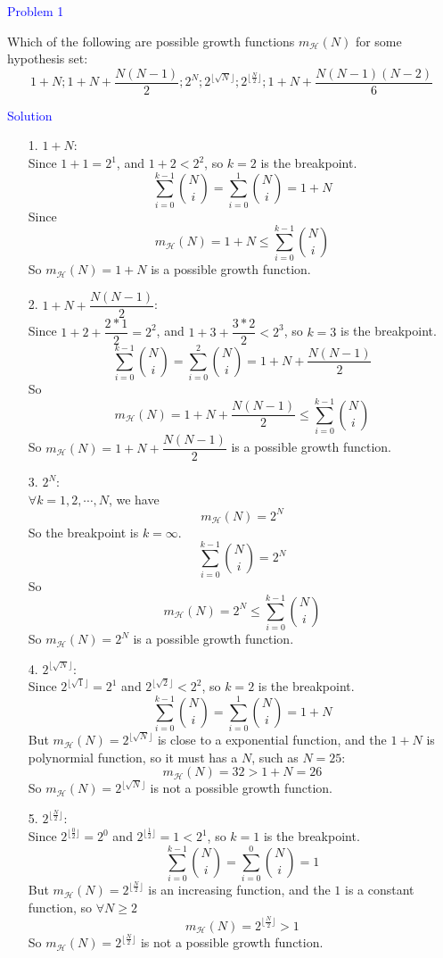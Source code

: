 \textcolor{blue}{Problem 1}

Which of the following are possible growth functions $m_{\mathcal{H}}(N)$ for some hypothesis set:
$$
1+N ; 1+N+\dfrac{N(N-1)}{2} ; 2^N ; 2^{\lfloor\sqrt{N}\rfloor} ; 2^{\lfloor \frac{N}{2} \rfloor} ; 1+N+\dfrac{N(N-1)(N-2)}{6}
$$

\textcolor{blue}{Solution}\\
\begin{itemize}
    \item[1. ] $1+N$:\\
    Since $1+1=2^1$, and $1+2<2^2$, so $k=2$ is the breakpoint.
    $$\sum_{i=0}^{k-1} \binom{N}{i} = \sum_{i=0}^{1} \binom{N}{i} = 1+N$$
    Since $$m_{\mathcal{H}}(N)=1+N\leq \sum_{i=0}^{k-1} \binom{N}{i}$$
    So $m_{\mathcal{H}}(N)=1+N$ is a possible growth function.
    
    \item[2. ]  $1+N+\dfrac{N(N-1)}{2}$:\\
    Since $1+2+\dfrac{2*1}{2}=2^2$, and $1+3+\dfrac{3*2}{2}<2^3$, so $k=3$ is the breakpoint.
    $$\sum_{i=0}^{k-1} \binom{N}{i} = \sum_{i=0}^{2} \binom{N}{i} = 1+N+\dfrac{N(N-1)}{2}$$
    So $$m_{\mathcal{H}}(N)=1+N+\dfrac{N(N-1)}{2}\leq \sum_{i=0}^{k-1} \binom{N}{i}$$
    So $m_{\mathcal{H}}(N)=1+N+\dfrac{N(N-1)}{2}$ is a possible growth function.
    
    \item[3. ] $2^N$:\\
    $\forall k=1,2,\cdots,N$, we have
    $$m_{\mathcal{H}}(N)=2^N$$
    So the breakpoint is $k=\infty$.
    $$\sum_{i=0}^{k-1} \binom{N}{i} = 2^N$$
    So $$m_{\mathcal{H}}(N)=2^N\leq \sum_{i=0}^{k-1} \binom{N}{i}$$
    So $m_{\mathcal{H}}(N)=2^N$ is a possible growth function.
    
    \item[4.] $2^{\lfloor\sqrt{N}\rfloor}$:\\
    Since $2^{\lfloor\sqrt{1}\rfloor}=2^1$ and $2^{\lfloor\sqrt{2}\rfloor}<2^2$, so $k=2$ is the breakpoint.
    $$\sum_{i=0}^{k-1} \binom{N}{i} = \sum_{i=0}^{1} \binom{N}{i} = 1+N$$
    But $m_{\mathcal{H}}(N)=2^{\lfloor\sqrt{N}\rfloor}$ is close to a exponential function, and the $1+N$ is polynormial function, so it must has a $N$, such as $N=25$:
    $$m_{\mathcal{H}}(N)=32>1+N=26$$
    So $m_{\mathcal{H}}(N)=2^{\lfloor\sqrt{N}\rfloor}$ is not a possible growth function.

    \item[5.] $2^{\lfloor \frac{N}{2} \rfloor}$:\\
    Since $2^{\lfloor \frac{0}{2}\rfloor}=2^0$ and $2^{\lfloor \frac{1}{2}\rfloor}=1<2^1$, so $k=1$ is the breakpoint.
    $$\sum_{i=0}^{k-1} \binom{N}{i} = \sum_{i=0}^{0} \binom{N}{i} = 1$$
    But $m_{\mathcal{H}}(N)=2^{\lfloor\frac{N}{2}\rfloor}$ is an increasing function, and the $1$ is a constant function, so $\forall N\geq 2$
    $$m_{\mathcal{H}}(N)=2^{\lfloor \frac{N}{2}\rfloor}>1$$
    So $m_{\mathcal{H}}(N)=2^{\lfloor \frac{N}{2}\rfloor}$ is not a possible growth function.
    

\end{itemize}
